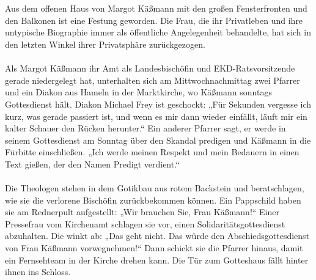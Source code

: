\documentclass[a4paper,12pt,oneside]{scrbook}
\begin{document}
\\\\
Aus dem offenen Haus von Margot Käßmann mit den großen Fensterfronten und den Balkonen ist eine Festung geworden. Die Frau, die ihr Privatleben und ihre untypische Biographie immer als öffentliche Angelegenheit behandelte, hat sich in den letzten Winkel ihrer Privatsphäre zurückgezogen.
\\\\
Als Margot Käßmann ihr Amt als Landesbischöfin und EKD-Ratsvorsitzende gerade niedergelegt hat, unterhalten sich am Mittwochnachmittag zwei Pfarrer und ein Diakon aus Hameln in der Marktkirche, wo Käßmann sonntags Gottesdienst hält. Diakon Michael Frey ist geschockt: „Für Sekunden vergesse ich kurz, was gerade passiert ist, und wenn es mir dann wieder einfällt, läuft mir ein kalter Schauer den Rücken herunter.“ Ein anderer Pfarrer sagt, er werde in seinem Gottesdienst am Sonntag über den Skandal predigen und Käßmann in die Fürbitte einschließen. „Ich werde meinen Respekt und mein Bedauern in einen Text gießen, der den Namen Predigt verdient.“
\\\\
Die Theologen stehen in dem Gotikbau aus rotem Backstein und beratschlagen, wie sie die verlorene Bischöfin zurückbekommen können. Ein Pappschild haben sie am Rednerpult aufgestellt: „Wir brauchen Sie, Frau Käßmann!“ Einer Pressefrau vom Kirchenamt schlagen sie vor, einen Solidaritätsgottesdienst abzuhalten. Die winkt ab: „Das geht nicht. Das würde den Abschiedsgottesdienst von Frau Käßmann vorwegnehmen!“ Dann schickt sie die Pfarrer hinaus, damit ein Fernsehteam in der Kirche drehen kann. Die Tür zum Gotteshaus fällt hinter ihnen ins Schloss.
\end{document}
